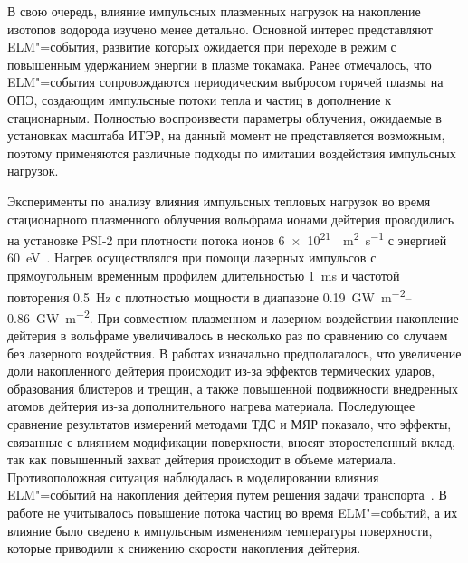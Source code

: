 В свою очередь, влияние импульсных плазменных нагрузок на накопление изотопов водорода изучено менее детально. Основной интерес представляют ELM"=события, развитие которых ожидается при переходе в режим с повышенным удержанием энергии в плазме токамака. Ранее отмечалось, что ELM"=события сопровождаются периодическим выбросом горячей плазмы на ОПЭ, создающим импульсные потоки тепла и частиц в дополнение к стационарным. Полностью воспроизвести параметры облучения, ожидаемые в установках масштаба ИТЭР, на данный момент не представляется возможным, поэтому применяются различные подходы по имитации воздействия импульсных нагрузок.

Эксперименты по анализу влияния импульсных тепловых нагрузок во время стационарного плазменного облучения вольфрама ионами дейтерия проводились на установке PSI-2 при плотности потока ионов \SI{6e21}{\per\meter\squared\per\second} с энергией \SI{60}{\electronvolt}~\cite{Huber2016_1, Huber2016_2}. Нагрев осуществлялся при помощи лазерных импульсов с прямоугольным временным профилем длительностью \SI{1}{\milli\second} и частотой повторения \SI{0.5}{\hertz} с плотностью мощности в диапазоне \SIrange{0.19}{0.86}{\giga\watt\per\meter\squared}. При совместном плазменном и лазерном воздействии накопление дейтерия в вольфраме увеличивалось в несколько раз по сравнению со случаем без лазерного воздействия. В работах изначально предполагалось, что увеличение доли накопленного дейтерия происходит из-за эффектов термических ударов, образования блистеров и трещин, а также повышенной подвижности внедренных атомов дейтерия из-за дополнительного нагрева материала. Последующее сравнение результатов измерений методами ТДС и МЯР показало, что эффекты, связанные с влиянием модификации поверхности, вносят второстепенный вклад, так как повышенный захват дейтерия происходит в объеме материала. Противоположная ситуация наблюдалась в моделировании влияния ELM"=событий на накопления дейтерия путем решения задачи транспорта~\cite{Hu2015}. В работе не учитывалось повышение потока частиц во время ELM"=событий, а их влияние было сведено к импульсным изменениям температуры поверхности, которые приводили к снижению скорости накопления дейтерия.

